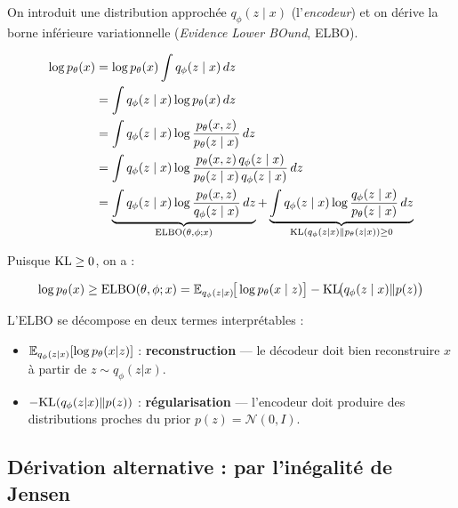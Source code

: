 On introduit une distribution approch\'ee $q_\phi(z \mid x)$ (l'\emph{encodeur}) et on d\'erive la borne inf\'erieure variationnelle (\emph{Evidence Lower BOund}, ELBO).

\begin{theoreme}
\label{thm:elbo-kl}
\begin{align}
\log p_\theta(x) &= \log p_\theta(x) \int q_\phi(z \mid x)\, dz \label{eq:elbo-start}\\
&= \int q_\phi(z \mid x) \log p_\theta(x)\, dz \\
&= \int q_\phi(z \mid x) \log \frac{p_\theta(x, z)}{p_\theta(z \mid x)}\, dz \\
&= \int q_\phi(z \mid x) \log \frac{p_\theta(x, z)\, q_\phi(z \mid x)}{p_\theta(z \mid x)\, q_\phi(z \mid x)}\, dz \\
&= \underbrace{\int q_\phi(z \mid x) \log \frac{p_\theta(x, z)}{q_\phi(z \mid x)}\, dz}_{\text{ELBO}(\theta, \phi; x)} + \underbrace{\int q_\phi(z \mid x) \log \frac{q_\phi(z \mid x)}{p_\theta(z \mid x)}\, dz}_{\mathrm{KL}(q_\phi(z|x) \| p_\theta(z|x)) \geq 0}
\end{align}
\end{theoreme}

Puisque $\mathrm{KL} \geq 0$, on a :

\begin{mathbox}[title=\textbf{Evidence Lower Bound (ELBO)}]
\begin{equation}
\log p_\theta(x) \geq \text{ELBO}(\theta, \phi; x) = \mathbb{E}_{q_\phi(z|x)}\!\big[\log p_\theta(x \mid z)\big] - \mathrm{KL}\!\big(q_\phi(z \mid x) \| p(z)\big)
\label{eq:elbo}
\end{equation}
\end{mathbox}

\begin{intuition}
L'ELBO se d\'ecompose en deux termes interpr\'etables :
\begin{itemize}
    \item $\mathbb{E}_{q_\phi(z|x)}[\log p_\theta(x|z)]$ : \textbf{reconstruction} --- le d\'ecodeur doit bien reconstruire $x$ \`a partir de $z \sim q_\phi(z|x)$.
    \item $-\mathrm{KL}(q_\phi(z|x) \| p(z))$ : \textbf{r\'egularisation} --- l'encodeur doit produire des distributions proches du prior $p(z) = \mathcal{N}(0, I)$.
\end{itemize}
\end{intuition}

\subsection{D\'erivation alternative : par l'in\'egalit\'e de Jensen}

